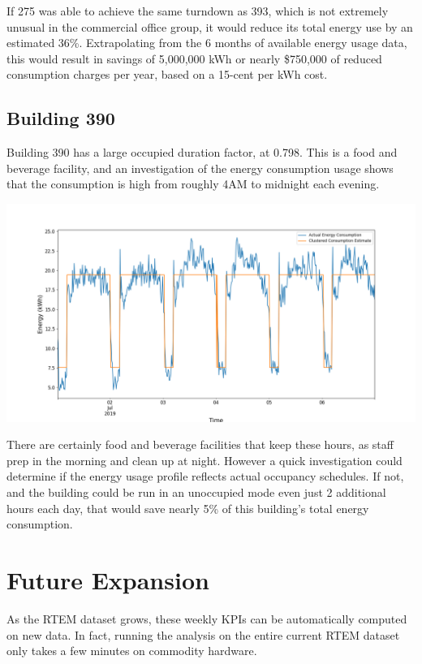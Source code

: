 \documentclass[a4paper]{article}
\begin{document}
If 275 was able to achieve the same turndown as 393, which is not extremely unusual in the commercial office group, it would reduce its total energy use by an estimated 36\%. Extrapolating from the 6 months of available energy usage data, this would result in savings of 5,000,000 kWh or nearly \$750,000 of reduced consumption charges per year, based on a 15-cent per kWh cost.

\subsection{Building 390}

Building 390 has a large occupied duration factor, at 0.798. This is a food and beverage facility, and an investigation of the energy consumption usage shows that the consumption is high from roughly 4AM to midnight each evening.

\includegraphics[width=.8\columnwidth]{./images/390_Duration.png}

There are certainly food and beverage facilities that keep these hours, as staff prep in the morning and clean up at night. However a quick investigation could determine if the energy usage profile reflects actual occupancy schedules. If not, and the building could be run in an unoccupied mode even just 2 additional hours each day, that would save nearly 5\% of this building's total energy consumption.

\section{Future Expansion}

As the RTEM dataset grows, these weekly KPIs can be automatically computed on new data. In fact, running the analysis on the entire current RTEM dataset only takes a few minutes on commodity hardware.
\end{document}
